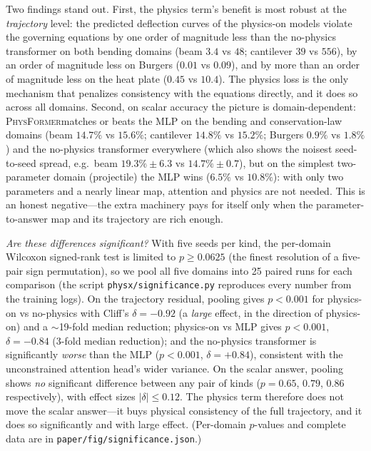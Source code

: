 \documentclass[11pt,a4paper]{article}
\newcommand{\PhysFormer}{\textsc{PhysFormer}}
\begin{document}
Two findings stand out. First, the physics term's benefit is most robust at
the \emph{trajectory} level: the predicted deflection curves of the
physics-on models violate the governing equations by one order of magnitude
less than the no-physics transformer on both bending domains (beam $3.4$
vs $48$; cantilever $39$ vs $556$), by an order of magnitude less on
Burgers ($0.01$ vs $0.09$), and by more than an order of magnitude less on
the heat plate ($0.45$ vs $10.4$). The physics loss is the only mechanism
that penalizes consistency with the equations directly, and it does so
across all domains. Second, on scalar accuracy the picture is domain-dependent:
\PhysFormer matches or beats the MLP on the bending and conservation-law
domains (beam $14.7\%$ vs $15.6\%$; cantilever $14.8\%$ vs $15.2\%$;
Burgers $0.9\%$ vs $1.8\%$) and the no-physics transformer everywhere
(which also shows the noisest seed-to-seed spread, e.g.\ beam $19.3\%\pm6.3$
vs $14.7\%\pm0.7$), but on the simplest two-parameter domain (projectile)
the MLP wins ($6.5\%$ vs $10.8\%$): with only two parameters and a nearly
linear map, attention and physics are not needed. This is an honest
negative---the extra machinery pays for itself only when the
parameter-to-answer map and its trajectory are rich enough.

\emph{Are these differences significant?} With five seeds per kind, the
per-domain Wilcoxon signed-rank test is limited to $p\geq0.0625$ (the
finest resolution of a five-pair sign permutation), so we pool all five
domains into 25 paired runs for each comparison (the script
\texttt{physx/significance.py} reproduces every number from the training
logs). On the trajectory residual, pooling gives $p<0.001$ for
physics-on vs no-physics with Cliff's $\delta=-0.92$ (a \emph{large}
effect, in the direction of physics-on) and a $\sim$19-fold median
reduction; physics-on vs MLP gives $p<0.001$, $\delta=-0.84$ (3-fold
median reduction); and the no-physics transformer is significantly
\emph{worse} than the MLP ($p<0.001$, $\delta=+0.84$), consistent with the
unconstrained attention head's wider variance. On the scalar answer,
pooling shows \emph{no} significant difference between any pair of kinds
($p=0.65$, $0.79$, $0.86$ respectively), with effect sizes
$|\delta|\leq0.12$. The physics term therefore does not move the scalar
answer---it buys physical consistency of the full trajectory, and it does
so significantly and with large effect. (Per-domain $p$-values and
complete data are in \texttt{paper/fig/significance.json}.)
\end{document}
